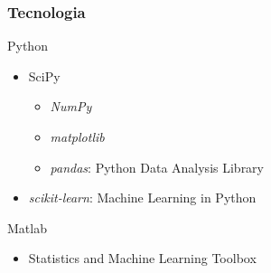 \documentclass{beamer}
\begin{document}
\begin{frame}
\frametitle{Tecnologia}
\begin{block}{Python}
\begin{itemize}
\item SciPy
	\begin{itemize}
	\item \textit{NumPy}
	\item \textit{matplotlib}
	\item \textit{pandas}: Python Data Analysis Library
	\end{itemize}
\item \textit{scikit-learn}: Machine Learning in Python
\end{itemize}
\end{block}

\begin{block}{Matlab}
\begin{itemize}
\item Statistics and Machine Learning Toolbox
\end{itemize}
\end{block}

\end{frame}
\end{document}
